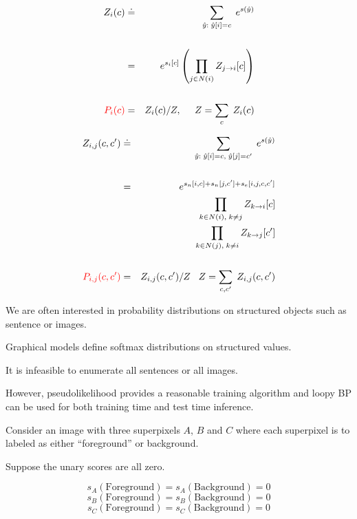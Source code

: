 {\begin{eqnarray*}
Z_i(c) & \doteq & \sum_{\hat{y}:\; \hat{y}[i] = c} \;e^{s(\hat{y})} \\
\\
& = & e^{s_i[c]} \left(\prod_{j\in N(i)} Z_{j \rightarrow i}[c]\right) \\
\\
{\color{red} P_i(c)} & = & Z_i(c)/Z,\;\;\;\;\; Z = \sum_{c}\;Z_i(c)
\end{eqnarray*}



\begin{eqnarray*}
Z_{i,j}(c,c') & \doteq & \sum_{\hat{y}:\; \hat{y}[i] = c,\;\hat{y}[j] = c'} \;e^{s(\hat{y})} \\
\\
& = & e^{s_n[i,c] + s_n[j,c'] +s_e[i,j,c,c']} \\
& & \prod_{k\in N(i),\;k \not = j} Z_{k \rightarrow i}[c] \\
& & \prod_{k\in N(j),\;k \not = i} Z_{k \rightarrow j}[c'] \\
\\
{\color{red} P_{i,j}(c,c')} & = & Z_{i,j}(c,c')/Z\;\;\;Z = \sum_{c,c'}\;Z_{i,j}(c,c')
\end{eqnarray*}



We are often interested in probability distributions on structured objects such as sentence or images.

\vfill
Graphical models define softmax distributions on structured values.

\vfill
It is infeasible to enumerate all sentences or all images.

\vfill
However, pseudolikelihood provides a reasonable training algorithm and loopy BP can be used for both training time and test time
inference.


}



Consider an image with three superpixels $A$, $B$ and $C$ where
each superpixel is to labeled as either ``foreground'' or background.

\vfill
Suppose the unary scores are all zero.

\vfill
$$s_A(\mathrm{Foreground}) = s_A(\mathrm{Background}) = 0$$
$$s_B(\mathrm{Foreground}) = s_B(\mathrm{Background}) = 0$$
$$s_C(\mathrm{Foreground}) = s_C(\mathrm{Background}) = 0$$

